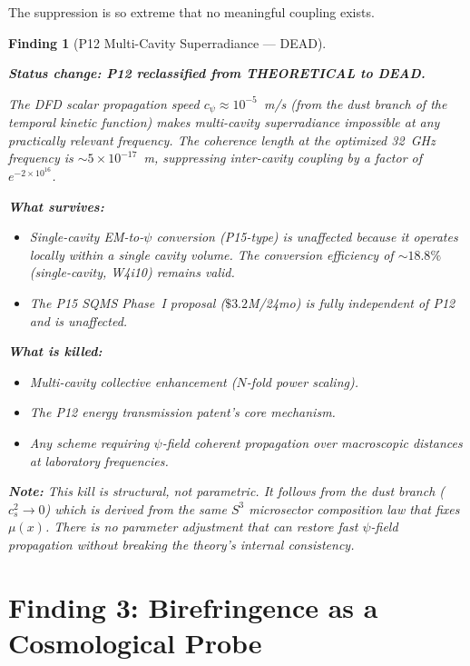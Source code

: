 \documentclass[11pt]{article}
\newtheorem{finding}{Finding}
\newcommand{\ee}[1]{\times 10^{#1}}
\begin{document}
The suppression is so extreme that no meaningful coupling exists.

\begin{finding}[P12 Multi-Cavity Superradiance --- DEAD]\label{find:P12-dead}

\textbf{Status change: P12 reclassified from THEORETICAL to DEAD.}

The DFD scalar propagation speed $c_\psi \approx 10^{-5}$~m/s
(from the dust branch of the temporal kinetic function) makes
multi-cavity superradiance impossible at any practically relevant
frequency. The coherence length at the optimized 32~GHz frequency
is $\sim 5\ee{-17}$~m, suppressing inter-cavity coupling by a
factor of $e^{-2\ee{16}}$.

\textbf{What survives:}
\begin{itemize}[nosep]
\item Single-cavity EM-to-$\psi$ conversion (P15-type) is unaffected
  because it operates locally within a single cavity volume. The
  conversion efficiency of $\sim 18.8\%$ (single-cavity, W4i10)
  remains valid.
\item The P15 SQMS Phase~I proposal ($\$3.2$M/24mo) is fully
  independent of P12 and is unaffected.
\end{itemize}

\textbf{What is killed:}
\begin{itemize}[nosep]
\item Multi-cavity collective enhancement ($N$-fold power scaling).
\item The P12 energy transmission patent's core mechanism.
\item Any scheme requiring $\psi$-field coherent propagation over
  macroscopic distances at laboratory frequencies.
\end{itemize}

\textbf{Note:} This kill is structural, not parametric. It follows
from the dust branch ($c_s^2 \to 0$) which is derived from the
same $S^3$ microsector composition law that fixes $\mu(x)$.
There is no parameter adjustment that can restore fast $\psi$-field
propagation without breaking the theory's internal consistency.
\end{finding}


\part{Finding 3: Birefringence as a Cosmological Probe}
\label{part:biref-cosmo}
\end{document}
